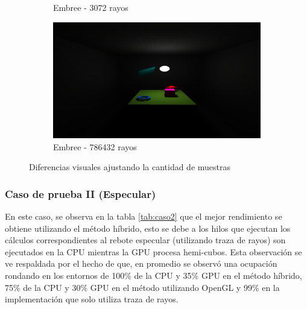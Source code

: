\begin{figure}[htbp]
\begin{subfigure}{0.45\textwidth}
		\caption{Embree - 3072 rayos}
	\end{subfigure}
	\begin{subfigure}{0.45\textwidth}
		\includegraphics[width=1\linewidth]{assets/512srt}
		\caption{Embree - 786432 rayos}
	\end{subfigure}
	\caption{Diferencias visuales ajustando la cantidad de muestras}
	\label{img:difres}
\end{figure}

\subsubsection{Caso de prueba II (Especular)}

En este caso, se observa en la tabla \ref{tab:caso2} que el mejor rendimiento se obtiene utilizando el método híbrido, esto se debe a los hilos que ejecutan los cálculos correspondientes al rebote especular (utilizando traza de rayos) son ejecutados en la CPU mientras la GPU procesa hemi-cubos. Esta observación se ve respaldada por el hecho de que, en promedio se observó una ocupación rondando en los entornos de 100\% de la CPU y 35\% GPU en el método híbrido, 75\% de la CPU y 30\% GPU en el método utilizando OpenGL y 99\% en la implementación que solo utiliza traza de rayos. 

